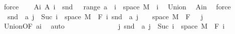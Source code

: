 \begin{isabellebody}
\ force\isanewline
\ \ \isamarkupfalse%
\ A{\isacharunderscore}{\kern0pt}i{\isacharcolon}{\kern0pt}\ {\isachardoublequoteopen}A\ i\ {\isacharequal}{\kern0pt}\ snd\ {\isacharbackquote}{\kern0pt}\ {\isacharparenleft}{\kern0pt}{\isasymUnion}\ {\isacharparenleft}{\kern0pt}range\ a{\isacharparenright}{\kern0pt}\ {\isasyminter}\ {\isacharparenleft}{\kern0pt}{\isacharbraceleft}{\kern0pt}i{\isacharbraceright}{\kern0pt}\ {\isasymtimes}\ space\ M{\isacharparenright}{\kern0pt}{\isacharparenright}{\kern0pt}{\isachardoublequoteclose}\ \ i\ \isamarkupfalse%
\ Union{\isacharparenleft}{\kern0pt}{}{\isacharparenright}{\kern0pt}\ \isamarkupfalse%
\ A{\isacharunderscore}{\kern0pt}in\ \isamarkupfalse%
\ force\ \isanewline
\ \ \isamarkupfalse%
\ {\isacharasterisk}{\kern0pt}{\isacharcolon}{\kern0pt}\ {\isachardoublequoteopen}snd\ {\isacharbackquote}{\kern0pt}\ {\isacharparenleft}{\kern0pt}a\ j\ {\isasyminter}\ {\isacharparenleft}{\kern0pt}{\isacharbraceleft}{\kern0pt}Suc\ i{\isacharbraceright}{\kern0pt}\ {\isasymtimes}\ space\ M{\isacharparenright}{\kern0pt}{\isacharparenright}{\kern0pt}\ {\isasymin}\ F\ i{\isachardoublequoteclose}\ {\isachardoublequoteopen}snd\ {\isacharbackquote}{\kern0pt}\ {\isacharparenleft}{\kern0pt}a\ j\ {\isasyminter}\ {\isacharparenleft}{\kern0pt}{\isacharbraceleft}{\kern0pt}{}{\isacharbraceright}{\kern0pt}\ {\isasymtimes}\ space\ M{\isacharparenright}{\kern0pt}{\isacharparenright}{\kern0pt}\ {\isasymin}\ F\ {}{\isachardoublequoteclose}\ \ j\ \isamarkupfalse%
\ Union{\isacharparenleft}{\kern0pt}{}{\isacharcomma}{\kern0pt}{}{\isacharparenright}{\kern0pt}{\isacharbrackleft}{\kern0pt}OF\ a{\isacharunderscore}{\kern0pt}i{\isacharbrackright}{\kern0pt}\ \isamarkupfalse%
\ auto\isanewline
\ \ \isacommand{{\isacharbraceleft}{\kern0pt}}\isamarkupfalse%
\isanewline
\ \ \ \ \isamarkupfalse%
\ {}\isanewline
\ \ \ \ \isamarkupfalse%
\ {\isachardoublequoteopen}{\isacharparenleft}{\kern0pt}{\isasymUnion}j{\isachardot}{\kern0pt}\ snd\ {\isacharbackquote}{\kern0pt}\ {\isacharparenleft}{\kern0pt}a\ j\ {\isasyminter}\ {\isacharparenleft}{\kern0pt}{\isacharbraceleft}{\kern0pt}Suc\ i{\isacharbraceright}{\kern0pt}\ {\isasymtimes}\ space\ M{\isacharparenright}{\kern0pt}{\isacharparenright}{\kern0pt}{\isacharparenright}{\kern0pt}\ {\isasymin}\ F\ i{\isachardoublequoteclose}\ \isamarkupfalse%
\ {\isacharasterisk}{\kern0pt}\ \isamarkupfalse%

\end{isabellebody}
